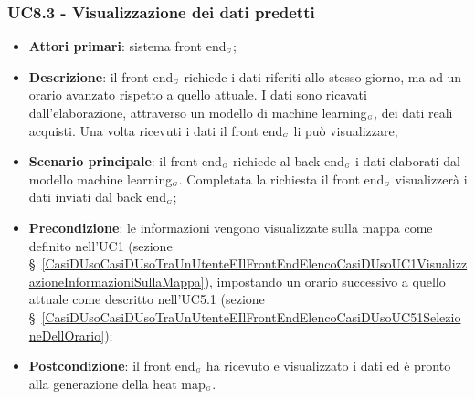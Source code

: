 \subsubsection{UC8.3 - Visualizzazione dei dati predetti}\label{CasiDUsoCasiDUsoTraIlFrontEndEIlBackEndElencoDeiCasiDUsoUC83VisualizzazioneDeiDatiPredetti}
\begin{itemize}
	\item \textbf{Attori primari}: sistema front end$_{\scaleto{G}{3pt}}$;
	\item \textbf{Descrizione}: il front end$_{\scaleto{G}{3pt}}$ richiede i dati riferiti allo stesso giorno, ma ad un orario avanzato rispetto a quello attuale.
	I dati sono ricavati dall’elaborazione, attraverso un modello di machine learning$_{\scaleto{G}{3pt}}$, dei dati reali acquisti. Una volta ricevuti i dati il front end$_{\scaleto{G}{3pt}}$ li può visualizzare;
	\item \textbf{Scenario principale}: il front end$_{\scaleto{G}{3pt}}$ richiede al back end$_{\scaleto{G}{3pt}}$ i dati elaborati dal modello machine learning$_{\scaleto{G}{3pt}}$. Completata la richiesta il front end$_{\scaleto{G}{3pt}}$ visualizzerà i dati inviati dal back end$_{\scaleto{G}{3pt}}$;
	\item \textbf{Precondizione}: le informazioni vengono visualizzate sulla mappa come definito nell’UC1 (sezione \S~\ref{CasiDUsoCasiDUsoTraUnUtenteEIlFrontEndElencoCasiDUsoUC1VisualizzazioneInformazioniSullaMappa}), impostando un orario successivo a quello attuale come descritto nell’UC5.1 (sezione \S~\ref{CasiDUsoCasiDUsoTraUnUtenteEIlFrontEndElencoCasiDUsoUC51SelezioneDellOrario});
	\item \textbf{Postcondizione}: il front end$_{\scaleto{G}{3pt}}$ ha ricevuto e visualizzato i dati ed è pronto alla generazione della heat map$_{\scaleto{G}{3pt}}$.
\end{itemize}

